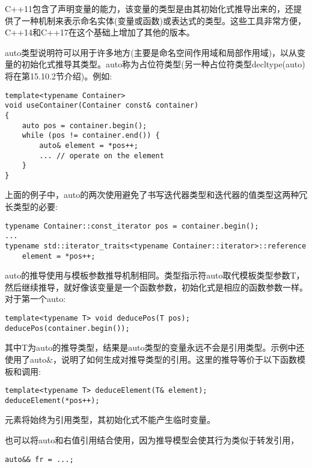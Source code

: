 
C++11包含了声明变量的能力，该变量的类型是由其初始化式推导出来的，还提供了一种机制来表示命名实体(变量或函数)或表达式的类型。这些工具非常方便，C++14和C++17在这个基础上增加了其他的版本。


auto类型说明符可以用于许多地方(主要是命名空间作用域和局部作用域)，以从变量的初始化式推导其类型。auto称为占位符类型(另一种占位符类型decltype(auto)将在第15.10.2节介绍)。例如:

\begin{lstlisting}[style=styleCXX]
template<typename Container>
void useContainer(Container const& container)
{
	auto pos = container.begin();
	while (pos != container.end()) {
		auto& element = *pos++;
		... // operate on the element
	}
}
\end{lstlisting}

上面的例子中，auto的两次使用避免了书写迭代器类型和迭代器的值类型这两种冗长类型的必要:

\begin{lstlisting}[style=styleCXX]
typename Container::const_iterator pos = container.begin();
...
typename std::iterator_traits<typename Container::iterator>::reference
	element = *pos++;
\end{lstlisting}

auto的推导使用与模板参数推导机制相同。类型指示符auto取代模板类型参数T，然后继续推导，就好像该变量是一个函数参数，初始化式是相应的函数参数一样。对于第一个auto:

\begin{lstlisting}[style=styleCXX]
template<typename T> void deducePos(T pos);
deducePos(container.begin());
\end{lstlisting}

其中T为auto的推导类型，结果是auto类型的变量永远不会是引用类型。示例中还使用了auto\&，说明了如何生成对推导类型的引用。这里的推导等价于以下函数模板和调用:

\begin{lstlisting}[style=styleCXX]
template<typename T> deduceElement(T& element);
deduceElement(*pos++);
\end{lstlisting}

元素将始终为引用类型，其初始化式不能产生临时变量。

也可以将auto和右值引用结合使用，因为推导模型会使其行为类似于转发引用，

\begin{lstlisting}[style=styleCXX]
auto&& fr = ...;
\end{lstlisting}

